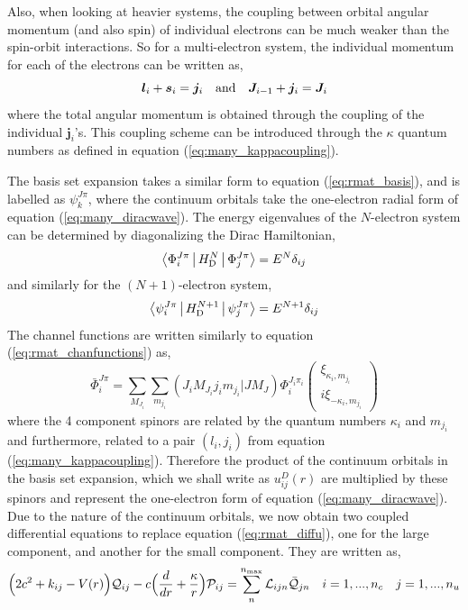 Also, when looking at heavier systems, the coupling between orbital angular momentum (and also spin) of individual electrons can be much weaker than the spin-orbit interactions. So for a multi-electron system, the individual momentum for each of the electrons can be written as,
\begin{equation}\label{eq:many_jj}
\boldsymbol{l}_i + \boldsymbol{s}_i = \boldsymbol{j}_i ~~~ {\rm and} ~~~ \boldsymbol{J}_{i-1} + \boldsymbol{j}_i = \boldsymbol{J}_i
\end{equation}
where the total angular momentum is obtained through the coupling of the individual $\boldsymbol{j}_i$'s. This coupling scheme can be introduced through the $\kappa$ quantum numbers as defined in equation (\ref{eq:many_kappacoupling}).

The basis set expansion takes a similar form to equation (\ref{eq:rmat_basis}), and is labelled as $\psi_k^{J\pi}$, where the continuum orbitals take the one-electron radial form of equation (\ref{eq:many_diracwave}). The energy eigenvalues of the $N$-electron system can be determined by diagonalizing the Dirac Hamiltonian,
\[
\Braket{\Phi_i^{J\pi} | H_{\rm D}^{N} | \Phi_j^{J\pi}} = E^N\delta_{ij}
\]
and similarly for the $(N+1)$-electron system,
\[
\Braket{\psi_i^{J\pi} | H_{\rm D}^{N+1} | \psi_j^{J\pi}} = E^{N+1}\delta_{ij}
\]
 The channel functions are written similarly to equation (\ref{eq:rmat_chanfunctions}) as,
\[
\bar{\Phi}^{J\pi}_i = \sum_{M_{J_i}}\sum_{m_{j_i}} (J_iM_{J_i}j_im_{j_i} | JM_J ) \Phi_i^{J_i\pi_i} \left( \begin{array}{c}
\xi_{\kappa_i,m_{j_i}}  \\
i\xi_{-\kappa_i,m_{j_i}}  \end{array} \right)
\]
where the 4 component spinors are related by the quantum numbers $\kappa_i$ and $m_{j_i}$ and furthermore, related to a pair $(l_i,j_i)$ from equation (\ref{eq:many_kappacoupling}). Therefore the product of the continuum orbitals in the basis set expansion, which we shall write as $u^D_{ij}(r)$ are multiplied by these spinors and represent the one-electron form of equation (\ref{eq:many_diracwave}). Due to the nature of the continuum orbitals, we now obtain two coupled differential equations to replace equation (\ref{eq:rmat_diffu}), one for the large component, and another for the small component. They are written as,
\[
\Big(2c^2 + k_{ij} -V(r)\Big)\mathcal{Q}_{ij} - c\Big(\frac{d}{dr} + \frac{\kappa}{r}\Big)\mathcal{P}_{ij} =\sum_{n}^{n_{\rm max}}\mathcal{L}_{ijn}\mathcal{\bar{Q}}_{jn} ~~~ i=1,...,n_c  ~~~ j=1,...,n_u
\]
